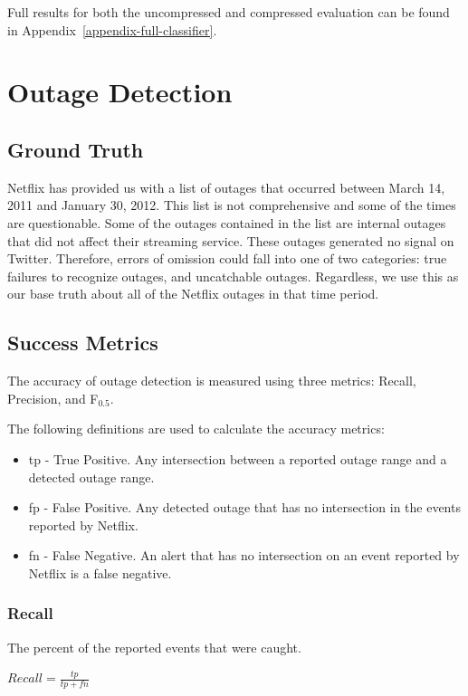 \documentclass[12pt]{ucthesis}
\begin{document}
Full results for both the uncompressed and compressed evaluation can be found in Appendix~\ref{appendix-full-classifier}.

\chapter{Outage Detection}
\label{outage-detection}

\section{Ground Truth}
\label{outage-detection-truth}
Netflix has provided us with a list of outages that occurred between March 14, 2011 and January 30, 2012.
This list is not comprehensive and some of the times are questionable. Some of the outages contained in the list
are internal outages that did not affect their streaming service. These outages generated no signal on Twitter.
Therefore, errors of omission could fall into one of two categories: true failures to recognize outages, and uncatchable
outages. Regardless, we use this as our base truth about all of the Netflix outages in that time period.

\section{Success Metrics}
\label{outage-detection-metrics}
The accuracy of outage detection is measured using three metrics: Recall, Precision, and F$_{0.5}$.

The following definitions are used to calculate the accuracy metrics:
\begin{itemize}
   \item{tp} - True Positive. Any intersection between a reported outage range and a detected outage range.
   \item{fp} - False Positive. Any detected outage that has no intersection in the events reported by Netflix.
   \item{fn} - False Negative. An alert that has no intersection on an event reported by Netflix is a false negative.
\end{itemize}

\subsection{Recall}
The percent of the reported events that were caught.
\begin{center}
   $Recall = \frac{tp}{tp + fn}$
\end{center}
\end{document}
